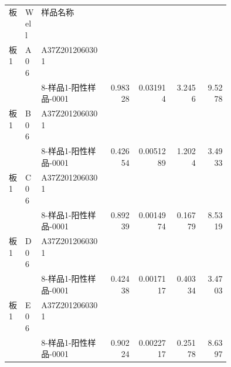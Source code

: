 \documentclass[UTF8,10pt,a4paper,fontset=fandol]{ctexart}
\newcommand{\fieldvalue}[1]{#1}
\begin{document}
\begin{small}
\begin{tabular}{p{0.07\linewidth}p{0.07\linewidth}p{0.30\linewidth}rrrr}
板 & Well & 样品名称 & & & & \\
板1 & A06 & A37Z2012060301\\[-2pt]
    &     & 8-样品1-阳性样品-0001 &
\fieldvalue{0.98328} &
\fieldvalue{0.031914} &
\fieldvalue{3.2456} &
\fieldvalue{9.5278} \\

板1 & B06 & A37Z2012060301\\[-2pt]
    &     & 8-样品1-阳性样品-0001 &
\fieldvalue{0.42654} &
\fieldvalue{0.0051289} &
\fieldvalue{1.2024} &
\fieldvalue{3.4933} \\

板1 & C06 & A37Z2012060301\\[-2pt]
    &     & 8-样品1-阳性样品-0001 &
\fieldvalue{0.89239} &
\fieldvalue{0.0014974} &
\fieldvalue{0.16779} &
\fieldvalue{8.5319} \\

板1 & D06 & A37Z2012060301\\[-2pt]
    &     & 8-样品1-阳性样品-0001 &
\fieldvalue{0.42438} &
\fieldvalue{0.0017117} &
\fieldvalue{0.40334} &
\fieldvalue{3.4703} \\

板1 & E06 & A37Z2012060301\\[-2pt]
    &     & 8-样品1-阳性样品-0001 &
\fieldvalue{0.90224} &
\fieldvalue{0.0022717} &
\fieldvalue{0.25178} &
\fieldvalue{8.6397} \\


\end{tabular}
\end{small}
\end{document}

